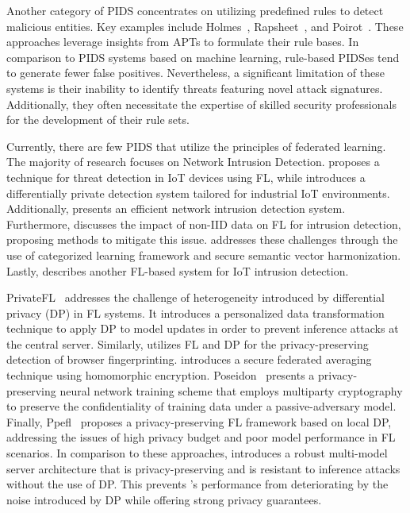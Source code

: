  Another category of PIDS concentrates on utilizing predefined rules to detect malicious entities. Key examples include Holmes~\cite{holmes2019}, Rapsheet~\cite{rapsheet2020}, and Poirot~\cite{poirot2019}. These approaches leverage insights from APTs to formulate their rule bases. In comparison to PIDS systems based on machine learning, rule-based PIDSes tend to generate fewer false positives. Nevertheless, a significant limitation of these systems is their inability to identify threats featuring novel attack signatures. Additionally, they often necessitate the expertise of skilled security professionals for the development of their rule sets.

Currently, there are few PIDS that utilize the principles of federated learning. The majority of research focuses on Network Intrusion Detection. \cite{man2021intelligent} proposes a technique for threat detection in IoT devices using FL, while \cite{friha20232df} introduces a differentially private detection system tailored for industrial IoT environments. Additionally, \cite{li2023efficient} presents an efficient network intrusion detection system. Furthermore, \cite{guo2023new} discusses the impact of non-IID data on FL for intrusion detection, proposing methods to mitigate this issue.  \Sys addresses these challenges through the use of categorized \gnnshort learning framework and secure semantic vector harmonization. Lastly, \cite{chaabene2023privacy} describes another FL-based system for IoT intrusion detection.

 PrivateFL~\cite{yang2023privatefl} addresses the challenge of heterogeneity introduced by differential privacy (DP) in FL systems. It introduces a personalized data transformation technique to apply DP to model updates in order to prevent inference attacks at the central server. Similarly, \cite{annamalai2023fp} utilizes FL and DP for the privacy-preserving detection of browser fingerprinting. \cite{dasu2022prov} introduces a secure federated averaging technique using homomorphic encryption. Poseidon~\cite{sav2020poseidon} presents a privacy-preserving neural network training scheme that employs multiparty cryptography to preserve the confidentiality of training data under a passive-adversary model. Finally, Ppefl~\cite{wang2023ppefl} proposes a privacy-preserving FL framework based on local DP, addressing the issues of high privacy budget and poor model performance in FL scenarios. In comparison to these approaches, \Sys introduces a robust multi-model server architecture that is privacy-preserving and is resistant to inference attacks without the use of DP. This prevents \Sys's performance from deteriorating by the noise introduced by DP while offering strong privacy guarantees.
 
